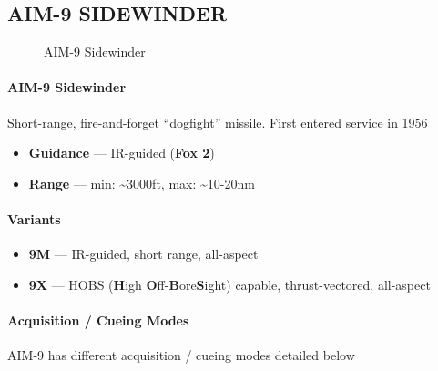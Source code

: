 \subsection{AIM-9 SIDEWINDER}
\label{subsec:aim9}
\begin{figure}[htbp]
    \centering
    \caption{AIM-9 Sidewinder}
\end{figure}

\paragraph{AIM-9 Sidewinder}
Short-range, fire-and-forget ``dogfight'' missile. First entered service in 1956

\begin{itemize}
    \item \textbf{Guidance} --- IR-guided (\textbf{Fox 2})
    \item \textbf{Range} --- min: \textasciitilde3000ft, max: \textasciitilde10-20nm
\end{itemize}

\paragraph{Variants}
\begin{itemize}
    \item \textbf{9M} --- IR-guided, short range, all-aspect
    \item \textbf{9X} --- HOBS (\textbf{H}igh \textbf{O}ff-\textbf{B}ore\textbf{S}ight) capable, thrust-vectored, all-aspect
\end{itemize}

\paragraph{Acquisition / Cueing Modes}
AIM-9 has different acquisition / cueing modes detailed below

